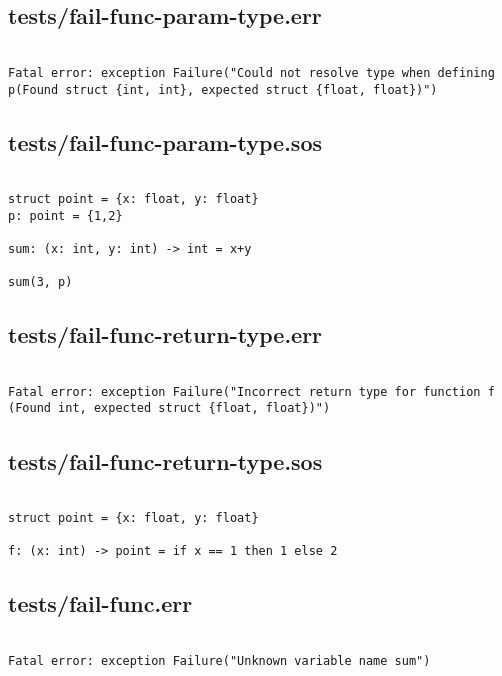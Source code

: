 \documentclass[main.tex]{subfiles}
\begin{document}
\subsection{tests/fail-func-param-type.err}

\begin{lstlisting}

Fatal error: exception Failure("Could not resolve type when defining p(Found struct {int, int}, expected struct {float, float})")
\end{lstlisting}

\subsection{tests/fail-func-param-type.sos}

\begin{lstlisting}

struct point = {x: float, y: float}
p: point = {1,2}

sum: (x: int, y: int) -> int = x+y

sum(3, p)
\end{lstlisting}

\subsection{tests/fail-func-return-type.err}

\begin{lstlisting}

Fatal error: exception Failure("Incorrect return type for function f (Found int, expected struct {float, float})")
\end{lstlisting}

\subsection{tests/fail-func-return-type.sos}

\begin{lstlisting}

struct point = {x: float, y: float}

f: (x: int) -> point = if x == 1 then 1 else 2
\end{lstlisting}

\subsection{tests/fail-func.err}

\begin{lstlisting}

Fatal error: exception Failure("Unknown variable name sum")
\end{lstlisting}
\end{document}
